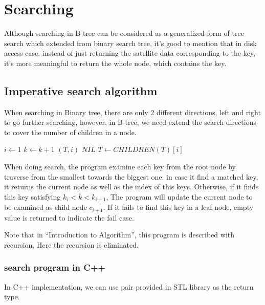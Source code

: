 \documentclass{article}
\begin{document}
\section{Searching} 

Although searching in B-tree can be considered as a generalized
form of tree search which extended from binary search tree, it's good
to mention that in disk access case, instead of just returning the
satellite data corresponding to the key, it's more meaningful to
return the whole node, which contains the key.

\subsection{Imperative search algorithm}

When searching in Binary tree, there are only 2 different directions,
left and right to go further searching, however, in B-tree, we need
extend the search directions to cover the number of children in a
node.

\begin{algorithmic}[1]
  \Loop
    \State $i \gets 1$
      \State $k \gets k+1$
    \EndWhile
      \State \Return $(T, i)$
    \EndIf
      \State \Return $NIL$ 
    \Else
      \State $T \gets CHILDREN(T)[i]$
    \EndIf
  \EndLoop
\EndFunction
\end{algorithmic}

When doing search, the program examine each key from the root node by
traverse from the smallest towards the biggest one. in case it find a
matched key, it returns the current node as well as the index of this
keys. Otherwise, if it finds this key satisfying $k_i < k < k_{i+1}$, 
The program will update the current node to be examined as child node 
$c_{i+1}$. If it
fails to find this key in a leaf node, empty value is returned to
indicate the fail case.

Note that in ``Introduction to Algorithm'', this program is described
with recursion, Here the recursion is eliminated.

\subsubsection*{search program in C++}
In C++ implementation, we can use pair provided in STL library as
the return type.
\end{document}

